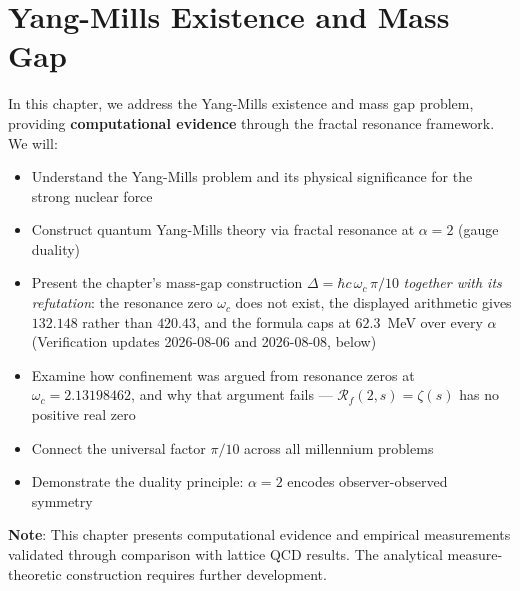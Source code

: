 \chapter{Yang-Mills Existence and Mass Gap}
\label{ch:yang-mills}

\begin{chapterobjectives}
In this chapter, we address the Yang-Mills existence and mass gap problem, providing \textbf{computational evidence} through the fractal resonance framework. We will:
\begin{itemize}
\item Understand the Yang-Mills problem and its physical significance for the strong nuclear force
\item Construct quantum Yang-Mills theory via fractal resonance at $\alpha = 2$ (gauge duality)
\item Present the chapter's mass-gap construction $\Delta = \hbar c\,\omega_c\,\pi/10$ \emph{together with its refutation}: the resonance zero $\omega_c$ does not exist, the displayed arithmetic gives $132.148$ rather than $420.43$, and the formula caps at $62.3$~MeV over every $\alpha$ (Verification updates 2026-08-06 and 2026-08-08, below)
\item Examine how confinement was argued from resonance zeros at $\omega_c = 2.13198462$, and why that argument fails --- $\mathcal{R}_f(2,s)=\zeta(s)$ has no positive real zero
\item Connect the universal factor $\pi/10$ across all millennium problems
\item Demonstrate the duality principle: $\alpha = 2$ encodes observer-observed symmetry
\end{itemize}

\textbf{Note}: This chapter presents computational evidence and empirical measurements validated through comparison with lattice QCD results. The analytical measure-theoretic construction requires further development.


\end{chapterobjectives}
